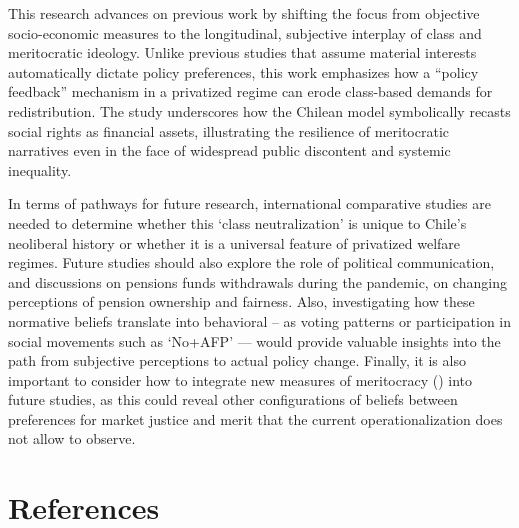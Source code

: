 \documentclass[
  12pt,
]{article}
\begin{document}
This research advances on previous work by shifting the focus from
objective socio-economic measures to the longitudinal, subjective
interplay of class and meritocratic ideology. Unlike previous studies
that assume material interests automatically dictate policy preferences,
this work emphasizes how a ``policy feedback'' mechanism in a privatized
regime can erode class-based demands for redistribution. The study
underscores how the Chilean model symbolically recasts social rights as
financial assets, illustrating the resilience of meritocratic narratives
even in the face of widespread public discontent and systemic
inequality.

In terms of pathways for future research, international comparative
studies are needed to determine whether this `class neutralization' is
unique to Chile's neoliberal history or whether it is a universal
feature of privatized welfare regimes. Future studies should also
explore the role of political communication, and discussions on pensions
funds withdrawals during the pandemic, on changing perceptions of
pension ownership and fairness. Also, investigating how these normative
beliefs translate into behavioral -- as voting patterns or participation
in social movements such as `No+AFP' --- would provide valuable insights
into the path from subjective perceptions to actual policy change.
Finally, it is also important to consider how to integrate new measures
of meritocracy () into future studies, as this could reveal other
configurations of beliefs between preferences for market justice and
merit that the current operationalization does not allow to observe.

\section{References}\label{references}
\end{document}
